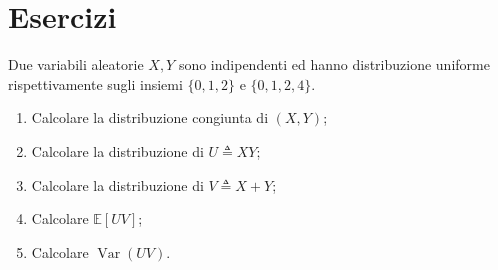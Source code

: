 \documentclass[a4paper]{article}
\begin{document}
\pagebreak

\section{Esercizi}

\begin{snippetexercise}{}
    Due variabili aleatorie \(X,Y\) sono indipendenti ed hanno distribuzione uniforme
    rispettivamente sugli insiemi \(\{0,1,2\}\) e \(\{0,1,2,4\}\).
    \begin{enumerate}
        \item Calcolare la distribuzione congiunta di \((X,Y)\);
        \item Calcolare la distribuzione di \(U \triangleq XY\);
        \item Calcolare la distribuzione di \(V \triangleq X + Y\);
        \item Calcolare \(\mathbb E[UV]\);
        \item Calcolare \(\operatorname{Var}(UV)\).
    \end{enumerate}
\end{snippetexercise}
\end{document}
